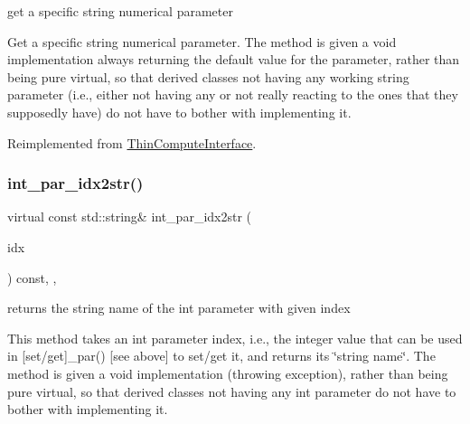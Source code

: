 get a specific string numerical parameter 

Get a specific string numerical parameter. The method is given a void implementation always returning the default value for the parameter, rather than being pure virtual, so that derived classes not having any working string parameter (i.\+e., either not having any or not really reacting to the ones that they supposedly have) do not have to bother with implementing it. 

Reimplemented from \mbox{\hyperlink{class_s_m_spp__di__unipi__it_1_1_thin_compute_interface_abdd41940763ebff749e5f16e6ea310c6}{Thin\+Compute\+Interface}}.

\mbox{\label{class_s_m_spp__di__unipi__it_1_1_f_row_constraint_a61e973f39747f63b8f56d97cc62e32ce}} 
\subsubsection{\texorpdfstring{int\+\_\+par\+\_\+idx2str()}{int\_par\_idx2str()}}
{\footnotesize\ttfamily virtual const std\+::string\& int\+\_\+par\+\_\+idx2str (\begin{DoxyParamCaption}\item[{const \mbox{\hyperlink{class_s_m_spp__di__unipi__it_1_1_thin_compute_interface_aa3d710629ad8c434286726ad810c3b47}{idx\+\_\+type}}}]{idx }\end{DoxyParamCaption}) const\hspace{0.3cm}{\ttfamily [inline]}, {\ttfamily [override]}, {\ttfamily [virtual]}}



returns the string name of the int parameter with given index 

This method takes an int parameter index, i.\+e., the integer value that can be used in \mbox{[}set/get\mbox{]}\+\_\+par() \mbox{[}see above\mbox{]} to set/get it, and returns its \char`\"{}string name\char`\"{}. The method is given a void implementation (throwing exception), rather than being pure virtual, so that derived classes not having any int parameter do not have to bother with implementing it. 

